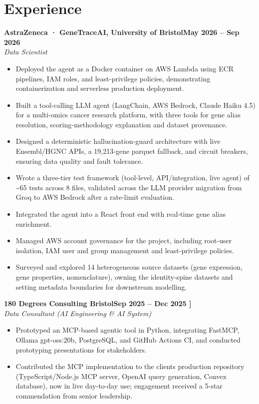 \documentclass[a4paper,11pt]{article}
\newcommand{\entry}[4]{\needspace{4\baselineskip}\noindent\textbf{#1}\hfill\textbf{#2}\\ \textit{#3}\hfill\textit{#4}\par}
\begin{document}
\section{Experience}
\entry{AstraZeneca · GeneTraceAI, University of Bristol}{May 2026 – Sep 2026}{Data Scientist}{}
\begin{itemize}
  \item Deployed the agent as a Docker container on AWS Lambda using ECR pipelines, IAM roles, and least-privilege policies, demonstrating containerization and serverless production deployment.
  \item Built a tool-calling LLM agent (LangChain, AWS Bedrock, Claude Haiku 4.5) for a multi-omics cancer research platform, with three tools for gene alias resolution, scoring-methodology explanation and dataset provenance.
  \item Designed a deterministic hallucination-guard architecture with live Ensembl/HGNC APIs, a 19,213-gene parquet fallback, and circuit breakers, ensuring data quality and fault tolerance.
  \item Wrote a three-tier test framework (tool-level, API/integration, live agent) of \textasciitilde{}65 tests across 8 files, validated across the LLM provider migration from Groq to AWS Bedrock after a rate-limit evaluation.
  \item Integrated the agent into a React front end with real-time gene alias enrichment.
  \item Managed AWS account governance for the project, including root-user isolation, IAM user and group management and least-privilege policies.
  \item Surveyed and explored 14 heterogeneous source datasets (gene expression, gene properties, nomenclature), owning the identity-spine datasets and setting metadata boundaries for downstream modelling.
\end{itemize}
\vspace{4pt}
\entry{180 Degrees Consulting Bristol}{Sep 2025 – Dec 2025   ]}{Data Consultant (AI Engineering \& AI System)}{}
\begin{itemize}
  \item Prototyped an MCP-based agentic tool in Python, integrating FastMCP, Ollama gpt-oss:20b, PostgreSQL, and GitHub Actions CI, and conducted prototyping presentations for stakeholders.
  \item Contributed the MCP implementation to the client\textquotesingle{}s production repository (TypeScript/Node.js MCP server, OpenAI query generation, Convex database), now in live day-to-day use; engagement received a 5-star commendation from senior leadership.
\end{itemize}
\end{document}
